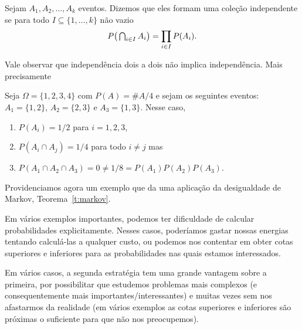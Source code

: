 
\begin{definition}
  Sejam $A_1, A_2, \dots, A_k$ eventos.
  Dizemos que eles formam uma coleção independente  se para todo $I \subseteq \{1, \dots, k\}$ não vazio
  \begin{equation}
    P\big( \operatorname*{{\textstyle \bigcap}}\nolimits_{i \in I} A_i \big) =  \prod\limits_{i \in I} P(A_i).
  \end{equation}
\end{definition}



Vale observar que independência dois a dois não implica independência.
Mais precisamente
\begin{example}
  Seja $\Omega = \{1,2,3,4\}$ com $P(A) = \# A/4$ e sejam os seguintes eventos: $A_1 = \{1,2\}$, $A_2 = \{2,3\}$ e $A_3 = \{1,3\}$.
  Nesse caso,
  \begin{enumerate}[\quad a)]
  \item $P(A_i) = 1/2$ para $i = 1, 2, 3$,
  \item $P(A_i \cap A_j) = 1/4$ para todo $i \neq j$ mas
  \item $P(A_1 \cap A_2 \cap A_3) = 0 \neq 1/8 = P(A_1) P(A_2) P(A_3)$.
  \end{enumerate}
\end{example}

Providenciamos agora um exemplo que da uma aplicação da desigualdade de Markov, Teorema~\ref{t:markov}.

Em vários exemplos importantes, podemos ter dificuldade de calcular probabilidades explicitamente.
Nesses casos, poderíamos gastar nossas energias tentando calculá-las a qualquer custo, ou podemos nos contentar em obter cotas superiores e inferiores para as probabilidades nas quais estamos interessados.

Em vários casos, a segunda estratégia tem uma grande vantagem sobre a primeira, por possibilitar que estudemos problemas mais complexos (e consequentemente mais importantes/interessantes) e muitas vezes sem nos afastarmos da realidade (em vários exemplos as cotas superiores e inferiores são próximas o suficiente para que não nos preocupemos).

